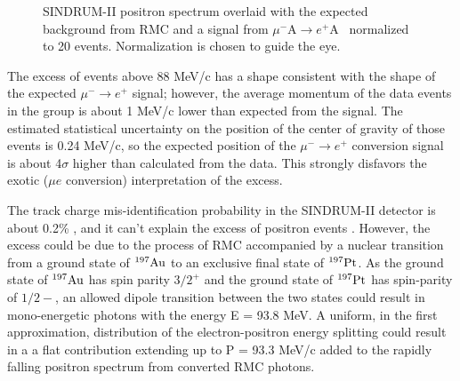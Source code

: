 \documentclass[12pt]{article}
\newcommand {\mumepconv}[1][A] {%
  \def\ArgI{{#1}}%
  \mumepconvRelay
}
\newcommand \mumepconvRelay[1][A]  {\mbox{$\mu^- \textrm{\ArgI} \rightarrow e^+ \textrm{#1}$}}
\newcommand {\Au}[1]     {\mbox{$\rm ^{#1}Au$}}                 %
\begin{document}
\begin{figure}
\caption {
  \label{fig:ana_step2_sindrum_positron_best_fit_signal}
  SINDRUM-II positron spectrum overlaid with the expected background from RMC
  and a signal from \mumepconv\ normalized to 20 events. Normalization is chosen
  to guide the eye.
}
\end{figure}

The excess of events above 88 MeV/c has a shape consistent with the shape
of the expected $\mu^- \rightarrow e^+$ signal; however, the average momentum of the
data events in the group is about 1 MeV/c lower than expected from the signal.
The estimated statistical uncertainty on the position of the center of gravity of those
events is 0.24 MeV/c, so the expected position of the $\mu^- \rightarrow e^+$ conversion
signal is about 4$\sigma$ higher than calculated from the data.
This strongly disfavors the exotic ($\mu e$ conversion) interpretation of the excess.

The track charge mis-identification probability in the SINDRUM-II detector
is about 0.2\% \cite{sindrum_ii:Kaulard1998}, and it can't explain the excess
of positron events .
%
However, the excess could be due to the process of RMC accompanied by a nuclear
transition from a ground state of \Au{197} to an exclusive final state
of $^{197}\rm Pt$. As the ground state of \Au{197} has spin parity $3/2^+$
and the ground state of $^{197} \rm Pt$ has spin-parity of $1/2-$,
an allowed dipole transition between the two states could result in mono-energetic
photons with the energy E = 93.8 MeV. A uniform, in the first approximation,
distribution of the electron-positron energy splitting could result in a a flat
contribution extending up to P = 93.3 MeV/c added to the rapidly falling positron
spectrum from converted RMC photons. 
\end{document}
